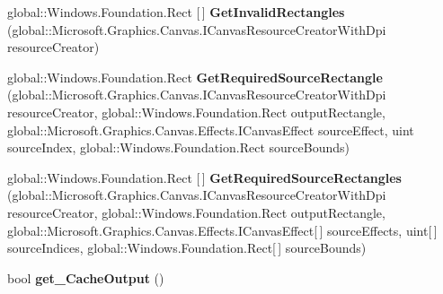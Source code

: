 \begin{DoxyCompactItemize}
\item 
\mbox{\label{interface_microsoft_1_1_graphics_1_1_canvas_1_1_effects_1_1_i_canvas_effect_a0220e194166c3d00d600f6b875b53a99}} 
global\+::\+Windows.\+Foundation.\+Rect \mbox{[}$\,$\mbox{]} {\bfseries Get\+Invalid\+Rectangles} (global\+::\+Microsoft.\+Graphics.\+Canvas.\+I\+Canvas\+Resource\+Creator\+With\+Dpi resource\+Creator)
\item 
\mbox{\label{interface_microsoft_1_1_graphics_1_1_canvas_1_1_effects_1_1_i_canvas_effect_af3c9446ecd22ba8c78ef3a8a382d21c3}} 
global\+::\+Windows.\+Foundation.\+Rect {\bfseries Get\+Required\+Source\+Rectangle} (global\+::\+Microsoft.\+Graphics.\+Canvas.\+I\+Canvas\+Resource\+Creator\+With\+Dpi resource\+Creator, global\+::\+Windows.\+Foundation.\+Rect output\+Rectangle, global\+::\+Microsoft.\+Graphics.\+Canvas.\+Effects.\+I\+Canvas\+Effect source\+Effect, uint source\+Index, global\+::\+Windows.\+Foundation.\+Rect source\+Bounds)
\item 
\mbox{\label{interface_microsoft_1_1_graphics_1_1_canvas_1_1_effects_1_1_i_canvas_effect_a164d8438529055d00d8f6ed3b12c4539}} 
global\+::\+Windows.\+Foundation.\+Rect \mbox{[}$\,$\mbox{]} {\bfseries Get\+Required\+Source\+Rectangles} (global\+::\+Microsoft.\+Graphics.\+Canvas.\+I\+Canvas\+Resource\+Creator\+With\+Dpi resource\+Creator, global\+::\+Windows.\+Foundation.\+Rect output\+Rectangle, global\+::\+Microsoft.\+Graphics.\+Canvas.\+Effects.\+I\+Canvas\+Effect\mbox{[}$\,$\mbox{]} source\+Effects, uint\mbox{[}$\,$\mbox{]} source\+Indices, global\+::\+Windows.\+Foundation.\+Rect\mbox{[}$\,$\mbox{]} source\+Bounds)
\item 
\mbox{\label{interface_microsoft_1_1_graphics_1_1_canvas_1_1_effects_1_1_i_canvas_effect_ade35aa78196aaa6fe9447696abb6d07f}} 
bool {\bfseries get\+\_\+\+Cache\+Output} ()
\item 
\mbox{\label{interface_microsoft_1_1_graphics_1_1_canvas_1_1_effects_1_1_i_canvas_effect_a83327dc0bb363f6f878802f5c971c033}} 

\end{DoxyCompactItemize}
